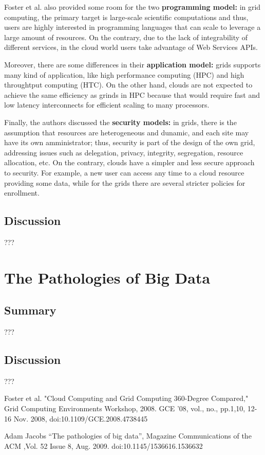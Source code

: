 \documentclass[a4paper]{IEEEtran}
\begin{document}
Foster et al. also provided some room for the two \textbf{programming model:} in grid computing, the primary target is large-scale scientific computations and thus, users are highly interested in programming languages that can scale to leverage a large amount of resources. On the contrary, due to the lack of integrability of different services, in the cloud world users take advantage of Web Services APIs.

Moreover, there are some differences in their \textbf{application model:} grids supports many kind of application, like high performance computing (HPC) and high throughtput computing (HTC). On the other hand, clouds are not expected to achieve the same efficiency as grinds in HPC because that would require fast and low latency interconnects for efficient scaling to many processors.

Finally, the authors discussed the \textbf{security models:} in grids, there is the assumption that resources are heterogeneous and dunamic, and each site may have its own amministrator; thus, security is part of the design of the own grid, addressing issues such as delegation, privacy, integrity, segregation, resource allocation, etc. On the contrary, clouds have a simpler and less secure approach to security. For example, a new user can access any time to a cloud resource providing some data, while for the grids there are several stricter policies for enrollment.

\subsection{Discussion}

???

\section{The Pathologies of Big Data}

\subsection{Summary}

???

\subsection{Discussion}

???

\begin{thebibliography}{1}

Foster  et  al.  "Cloud  Computing  and  Grid  Computing  360-Degree  Compared," Grid Computing Environments Workshop, 2008. GCE '08, vol., no., pp.1,10, 12-16 Nov. 2008, doi:10.1109/GCE.2008.4738445

Adam  Jacobs  “The  pathologies  of  big  data”,  Magazine Communications  of  the ACM ,Vol. 52 Issue 8, Aug. 2009. doi:10.1145/1536616.1536632

\end{thebibliography}
\end{document}
